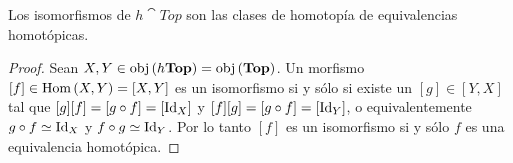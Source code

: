 \begin{ejercicio}\label{ej:69}
  Los isomorfismos de $h\cat{Top}$ son las clases de homotop\'ia de equivalencias
  homot\'opicas.
\end{ejercicio}
\begin{proof}%
  Sean $X,Y\in\text{obj}\left( h\mathbf{Top} \right)=\text{obj}\left( \mathbf{Top} \right)$. Un morfismo $[f]\in\text{Hom}\left( X,Y \right)=[X,Y]$ es un
  isomorfismo si y s\'olo si existe un $[g]\in[Y,X]$ tal que $[g][f]=[g\circ f]=[\text{Id}_{X}]$ y
  $[f][g]=[g\circ f]=[\text{Id}_Y]$, o equivalentemente $g\circ f\simeq\text{Id}_X$ y $f\circ g\simeq\text{Id}_Y$.
  Por lo tanto $[f]$ es un isomorfismo si y s\'olo $f$ es una equivalencia homot\'opica.
\end{proof}%


